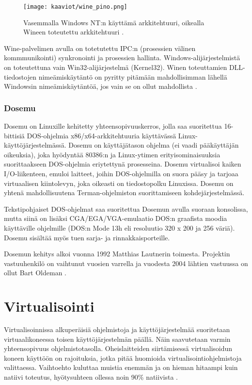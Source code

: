\begin{figure}[H]
\centering
\texttt{[image: kaaviot/wine\_pino.png]}
\caption{Vasemmalla Windows NT:n käyttämä arkkitehtuuri, oikealla Wineen toteutettu arkkitehtuuri \cite{wine:winnt_architecture,wine:architecture}. }
\label{wine_pino}
\end{figure}

Wine-palvelimen avulla on totetutettu IPC:n (prosessien välinen kommmunikointi) synkronointi ja prosessien hallinta. Windows-alijärjestelmistä on toteutettuna vain Win32-alijärjestelmä (Kernel32). Winen toteuttamien DLL-tiedostojen nimeämiskäytäntö on pyritty pitämään mahdollisimman lähellä Windowsin nimeämiskäytäntöä, jos vain se on ollut mahdollista \cite{wine:architecture}.

\subsubsection{Dosemu}
Dosemu on Linuxille kehitetty yhteensopivuuskerros, jolla saa suoritettua 16-bittisiä DOS-ohjelmia x86/x64-arkkitehtuuria käyttävässä Linux-käyttöjärjestelmässä. Dosemu on käyttäjätason ohjelma (ei vaadi pääkäyttäjän oikeuksia), joka hyödyntää 80386:n ja Linux-ytimen erityisominaisuuksia suorittaakseen DOS-ohjelmia eriytettynä prosesseina. Dosemu virtualisoi kaiken I/O-liikenteen, emuloi laitteet, joihin DOS-ohjelmilla on suora pääsy ja tarjoaa virtuaalisen kiintolevyn, joka oikeasti on tiedostopolku Linuxissa. Dosemu on yhtenä mahdollisuutena Terman-ohjelmiston suorittamiseen kohdejärjestelmässä.

Tekstipohjaiset DOS-ohjelmat saa suoritettua Dosemun avulla suoraan konsolissa, mutta siinä on lisäksi CGA/EGA/VGA-emulaatio DOS:n graafista moodia käyttäville ohjelmille (DOS:n Mode 13h eli resoluutio 320 x 200 ja 256 väriä). Dosemu sisältää myös tuen sarja- ja rinnakkaisporteille.

Dosemun kehitys alkoi vuonna 1992 Matthias Lautnerin toimesta. Projektin vastuuhenkilö on vaihtunut vuosien varrella ja vuodesta 2004 lähtien vastuussa on ollut Bart Oldeman \cite{dosemu:history}.




\section{Virtualisointi}
Virtualisoinnissa alkuperäisiä ohjelmistoja ja käyttöjärjestelmää suoritetaan virtuaalikoneessa toisen käyttöjärjestelmän päällä. Näin saavutetaan varmin yhteensopivuus ohjelmistotasolla. Oheislaitteiden siirtämisessä virtualisoidun koneen käyttöön on rajoituksia, jotka pitää huomioida virtualisointiohjelmistoja valittaessa. Vaihtoehto kuluttaa muistia enemmän ja on hieman hitaampi kuin natiivi toteutus, hyötysuhteen ollessa noin 90\%  natiivista \cite{virtnat_anadtech}.


